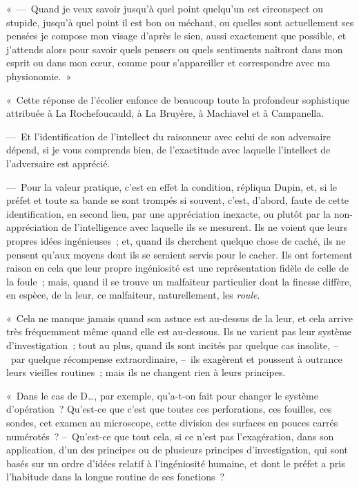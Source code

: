 \documentclass[french,twoside]{book} %
\begin{document}
« — Quand je veux savoir jusqu’à quel point quelqu’un est circonspect ou stupide, jusqu’à quel point il est bon ou méchant, ou quelles sont actuellement ses pensées je compose mon visage d’après le sien, aussi exactement que possible, et j’attends alors pour savoir quels pensers ou quels sentiments naîtront dans mon esprit ou dans mon cœur, comme pour s’appareiller et correspondre avec ma physionomie. »\par
« Cette réponse de l’écolier enfonce de beaucoup toute la profondeur sophistique attribuée à La Rochefoucauld, à La Bruyère, à Machiavel et à Campanella.\par
— Et l’identification de l’intellect du raisonneur avec celui de son adversaire dépend, si je vous comprends bien, de l’exactitude avec laquelle l’intellect de l’adversaire est apprécié.\par
— Pour la valeur pratique, c’est en effet la condition, répliqua Dupin, et, si le préfet et toute sa bande se sont trompés si souvent, c’est, d’abord, faute de cette identification, en second lieu, par une appréciation inexacte, ou plutôt par la non-appréciation de l’intelligence avec laquelle ils se mesurent. Ils ne voient que leurs propres idées ingénieuses ; et, quand ils cherchent quelque chose de caché, ils ne pensent qu’aux moyens dont ils se seraient servis pour le cacher. Ils ont fortement raison en cela que leur propre ingéniosité est une représentation fidèle de celle de la foule ; mais, quand il se trouve un malfaiteur particulier dont la finesse diffère, en espèce, de la leur, ce malfaiteur, naturellement, les \emph{roule}.\par
« Cela ne manque jamais quand son astuce est au-dessus de la leur, et cela arrive très fréquemment même quand elle est au-dessous. Ils ne varient pas leur système d’investigation ; tout au plus, quand ils sont incités par quelque cas insolite, – par quelque récompense extraordinaire, – ils exagèrent et poussent à outrance leurs vieilles routines ; mais ils ne changent rien à leurs principes.\par
« Dans le cas de D…, par exemple, qu’a-t-on fait pour changer le système d’opération ? Qu’est-ce que c’est que toutes ces perforations, ces fouilles, ces sondes, cet examen au microscope, cette division des surfaces en pouces carrés numérotés ? – Qu’est-ce que tout cela, si ce n’est pas l’exagération, dans son application, d’un des principes ou de plusieurs principes d’investigation, qui sont basés sur un ordre d’idées relatif à l’ingéniosité humaine, et dont le préfet a pris l’habitude dans la longue routine de ses fonctions ?\par
\end{document}
